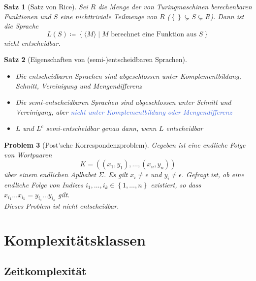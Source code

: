 \documentclass[11pt]{article}
\newcommand{\tcol}[1]{\textcolor{RoyalBlue}{#1}}
\newcommand{\set}[1]{\left\lbrace #1\right\rbrace}
\theoremstyle{break}
\newtheorem{satz}{Satz}[section]
\newtheorem{prob}[satz]{Problem}
\begin{document}
    \begin{satz}[Satz von Rice]
        Sei $R$ die Menge der von Turingmaschinen berechenbaren Funktionen und $S$ eine nichttriviale Teilmenge von $R$ ($\set{}\subsetneq S\subsetneq R$).
        Dann ist die Sprache \[L(S)\coloneqq\set{\langle M\rangle\mid M\text{ berechnet eine Funktion aus }S}\]
        nicht entscheidbar.
    \end{satz}

    \begin{satz}[Eigenschaften von (semi-)entscheidbaren Sprachen]
        \begin{itemize}
            \item Die entscheidbaren Sprachen sind abgeschlossen unter Komplementbildung, Schnitt, Vereinigung und Mengendifferenz
            \item Die semi-entscheidbaren Sprachen sind abgeschlossen unter Schnitt und Vereinigung, aber \tcol{nicht unter Komplementbildung oder Mengendifferenz}
            \item $L$ und $L^c$ semi-entscheidbar genau dann, wenn $L$ entscheidbar
        \end{itemize}
    \end{satz}

    \begin{prob}[Post'sche Korrespondenzproblem]
        Gegeben ist eine endliche Folge von Wortpaaren
        \[K=((x_1,y_1),\dots,(x_n,y_n))\]
        über einem endlichen Aplhabet $\Sigma$.
        Es gilt $x_i\neq\epsilon$ und $y_i\neq\epsilon$.
        Gefragt ist, ob eine endliche Folge von Indizes $i_1,\dots,i_k\in\set{1,\dots,n}$ existiert, so dass $x_{i_1}\dots x_{i_k}=y_{i_1}\dots y_{i_k}$ gilt.\\
        Dieses Problem ist nicht entscheidbar.
    \end{prob}



    \section{Komplexitätsklassen}
	\label{sec:komplexitätsklassenindex}


    \subsection{Zeitkomplexität}
	\label{subsec:zeitkomplexität}
\end{document}
